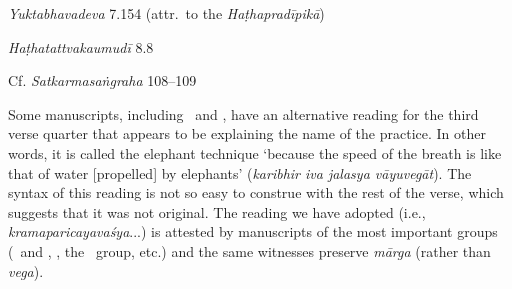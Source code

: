 \begin{ekdosis}
\begin{testimonia}[hp02_029]
\emph{Yuktabhavadeva} 7.154 (attr.~to the \emph{Haṭhapradīpikā})

\begin{versinnote}
\end{versinnote}

\emph{Haṭhatattvakaumudī} 8.8

\begin{versinnote}
\end{versinnote}

Cf. \emph{Satkarmasaṅgraha} 108–109

\begin{versinnote}
\end{versinnote}
\end{testimonia}

\begin{philcomm}[hp02_029]
Some manuscripts, including \etaTwo\ and \betaOmega, have an alternative reading for the third verse quarter that appears to be explaining the name of the practice. In other words, it is called the elephant technique `because the speed of the breath is like that of water [propelled] by elephants’ (\emph{karibhir iva jalasya vāyuvegāt}). The syntax of this reading is not so easy to construe with the rest of the verse, which suggests that it was not original. The reading we have adopted (i.e., \emph{kramaparicayavaśya}...) is attested by manuscripts of the most important groups (\alphaOne\ and \alphaTwo, \betaTwo, the \textgamma\ group, etc.) and the same witnesses preserve \emph{mārga} (rather than \emph{vega}). 


\end{philcomm}
\end{ekdosis}
